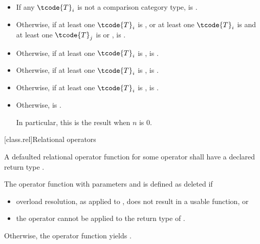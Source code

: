 \begin{itemize}
\item
If any $\tcode{T}_i$
is not a comparison category type,
 is .

\item
Otherwise, if
at least one $\tcode{T}_i$ is , or
at least one $\tcode{T}_i$ is  and
at least one $\tcode{T}_j$ is  or
                              ,
 is .

\item
Otherwise, if at least one $\tcode{T}_i$ is ,
 is .

\item
Otherwise, if at least one $\tcode{T}_i$ is ,
 is .

\item
Otherwise, if at least one $\tcode{T}_i$ is ,
 is .

\item
Otherwise,  is .
\begin{note}
In particular, this is the result when $n$ is 0.
\end{note}
\end{itemize}

[class.rel]{Relational operators}
%

\pnum
A defaulted relational operator function
for some operator 
shall have a declared return type .

\pnum
The operator function with parameters  and 
is defined as deleted if
\begin{itemize}
\item
overload resolution,
as applied to ,
does not result in a usable function, or

\item
the operator 
cannot be applied to the return type of .
\end{itemize}

Otherwise, the operator function yields
.

